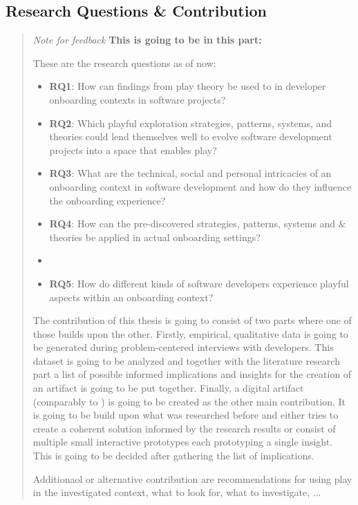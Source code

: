 \subsection{Research Questions \& Contribution}

\blockquote{
  \textit{Note for feedback}
  \textbf{This is going to be in this part:}

  These are the research questions as of now:

  \begin{itemize}
    \item{\textbf{RQ1}: How can findings from play theory be used to in developer onboarding contexts in software projects?}
    \item{\textbf{RQ2}: Which playful exploration strategies, patterns, systems, and theories could lend themselves well to evolve software development projects into a space that enables play?}
    \item{\textbf{RQ3}: What are the technical, social and personal intricacies of an onboarding context in software development and how do they influence the onboarding experience?}
    \item{\textbf{RQ4}: How can the pre-discovered strategies, patterns, systems and \& theories be applied in actual onboarding settings?}
    \item \item{\textbf{RQ5}: How do different kinds of software developers experience playful aspects within an onboarding context?}
  \end{itemize}

  The contribution of this thesis is going to consist of two parts where one of those builds upon the other. Firstly, empirical, qualitative data is going to be generated during problem-centered interviews with developers. This dataset is going to be analyzed and together with the literature research part a list of possible informed implications and insights for the creation of an artifact is going to be put together. Finally, a digital artifact (comparably to \cite{wobbrock2016research}) is going to be created as the other main contribution. It is going to be build upon what was researched before and either tries to create a coherent solution informed by the research results or consist of multiple small interactive prototypes each prototyping a single insight. This is going to be decided after gathering the list of implications.

  Additionaol or alternative contribution are recommendations for using play in the investigated context, what to look for, what to investigate, ...

}